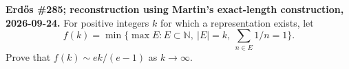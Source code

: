 \textbf{Erd\H{o}s \#285; reconstruction using Martin's exact-length construction, 2026-09-24.}
For positive integers $k$ for which a representation exists, let
\[
f(k)=\min\{\max E: E\subset\mathbb N,\ |E|=k,\ \sum_{n\in E}1/n=1\}.
\]
Prove that $f(k)\sim ek/(e-1)$ as $k\to\infty$.

